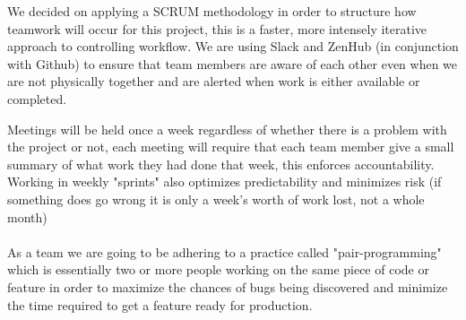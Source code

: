 \documentclass[12pt,a4paper]{article}
\begin{document}
\parbox{\textwidth}{ We decided on applying a SCRUM methodology in order to structure how teamwork will occur for
			this project, this is a faster, more intensely iterative approach to controlling workflow.
			We are using Slack and ZenHub (in conjunction with Github) to ensure that team members are aware of each other even when we are not physically together and are alerted when work is either available or completed.\\}
			Meetings will be held once a week regardless of whether there is a problem with
			the project or not, each meeting will require that each team member give a small summary
			of what work they had done that week, this enforces accountability. Working in weekly "sprints" also optimizes predictability and minimizes risk (if something does go wrong it is only a week's worth of work lost, not a whole month)\\\\
			As a team we are going to be adhering to a practice called "pair-programming" which is essentially two or more people working on the same piece of code or feature in order to maximize the chances of bugs being discovered and minimize the time required to get a feature ready for production. 
			\\ \\ 

	\newpage
\end{document}
